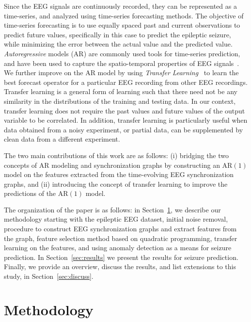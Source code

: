 \documentclass{article} %
\begin{document}
Since the EEG signals are continuously recorded, they can be represented as a time-series, and analyzed using time-series forecasting methods.  The objective of time-series forecasting is to use equally spaced past and current observations to predict future values, specifically in this case to predict the epileptic seizure, while minimizing the error between the actual value and the predicted value.  {\em Autoregressive} models (AR) are commonly used tools for time-series prediction, and have been used to capture the spatio-temporal properties of  EEG signals~\cite{anderson_offline_ar,subasi_EEG_AR}.  We further improve on the AR model by using {\em Transfer Learning}~\cite{transfer_learning_survey} to learn the best forecast operator for a particular EEG recording from other EEG recordings.  Transfer learning is a general form of learning such that there need not be any similarity in the distributions of the training and testing data.  In our context, transfer learning does not require the past values and future values of the output variable to be correlated.  In addition, transfer learning is particularly useful when data obtained from a noisy experiment, or partial data, can be supplemented by clean data from a different experiment.

The two main contributions of this work are as follows: (i) bridging the two concepts of AR modeling and synchronization graphs by constructing an AR$(1)$ model on the features extracted from the time-evolving EEG synchronization graphs,  and (ii) introducing the concept of transfer learning to improve the predictions of the AR$(1)$ model.

The organization of the paper is as follows: in Section~\ref{sec:method}, we describe our methodology starting with the epileptic EEG dataset, initial noise removal, procedure to construct EEG synchronization graphs and extract features from the graph, feature selection method based on quadratic programming, transfer learning on the features, and using anomaly detection as a means for seizure prediction.  In Section~\ref{sec:results} we present the results for seizure prediction.  Finally, we provide an overview, discuss the results, and list extensions to this study, in Section~\ref{sec:discuss}.

\section{Methodology} \label{sec:method}
\end{document}
